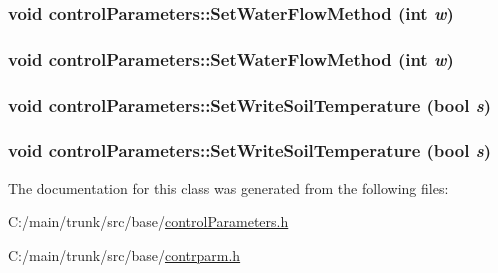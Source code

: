 \label{classcontrol_parameters_a41cbb9fab54ae32c76dbf36104dd14e9}
\hypertarget{classcontrol_parameters_af45477e3d79e2fcc8e34848c94b74a33}{
\subsubsection[{SetWaterFlowMethod}]{\setlength{\rightskip}{0pt plus 5cm}void controlParameters::SetWaterFlowMethod (int {\em w})}}
\label{classcontrol_parameters_af45477e3d79e2fcc8e34848c94b74a33}
\hypertarget{classcontrol_parameters_af45477e3d79e2fcc8e34848c94b74a33}{
\subsubsection[{SetWaterFlowMethod}]{\setlength{\rightskip}{0pt plus 5cm}void controlParameters::SetWaterFlowMethod (int {\em w})}}
\label{classcontrol_parameters_af45477e3d79e2fcc8e34848c94b74a33}
\hypertarget{classcontrol_parameters_a78a8f1dfd93321ab943ebfa1a6738a1e}{
\subsubsection[{SetWriteSoilTemperature}]{\setlength{\rightskip}{0pt plus 5cm}void controlParameters::SetWriteSoilTemperature (bool {\em s})}}
\label{classcontrol_parameters_a78a8f1dfd93321ab943ebfa1a6738a1e}
\hypertarget{classcontrol_parameters_a78a8f1dfd93321ab943ebfa1a6738a1e}{
\subsubsection[{SetWriteSoilTemperature}]{\setlength{\rightskip}{0pt plus 5cm}void controlParameters::SetWriteSoilTemperature (bool {\em s})}}
\label{classcontrol_parameters_a78a8f1dfd93321ab943ebfa1a6738a1e}


The documentation for this class was generated from the following files:\begin{DoxyCompactItemize}
\item 
C:/main/trunk/src/base/\hyperlink{control_parameters_8h}{controlParameters.h}\item 
C:/main/trunk/src/base/\hyperlink{contrparm_8h}{contrparm.h}\end{DoxyCompactItemize}
